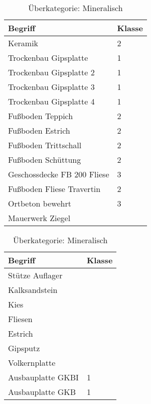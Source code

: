\begin{table}[h]
	\label{t:evaluation-example3}
	\centering
	\begin{tabular}{|p{}|p{}|}
		\hline
		\textbf{Begriff} & \textbf{Klasse} \\ \hline
	Keramik & 2 \\ \hline
	Trockenbau Gipsplatte & 1 \\ \hline
	Trockenbau Gipsplatte 2 & 1 \\ \hline
	Trockenbau Gipsplatte 3 & 1 \\ \hline
	Trockenbau Gipsplatte 4 & 1 \\ \hline
	Fußboden Teppich & 2 \\ \hline
	Fußboden Estrich & 2 \\ \hline
	Fußboden Trittschall & 2 \\ \hline
	Fußboden Schüttung & 2 \\ \hline
	Geschossdecke FB 200 Fliese & 3 \\ \hline
	Fußboden Fliese Travertin & 2 \\ \hline
	Ortbeton bewehrt & 3 \\ \hline
	Mauerwerk Ziegel & ~ \\ \hline
	\end{tabular}
	\caption{Überkategorie: Mineralisch}
\end{table}



\begin{table}[h]
	\label{t:evaluation-example4}
	\centering
	\begin{tabular}{|p{}|p{}|}
		\hline
		\textbf{Begriff} & \textbf{Klasse} \\ \hline
		Stütze Auflager & ~ \\ \hline
		Kalksandstein & ~ \\ \hline
		Kies & ~ \\ \hline
		Fliesen & ~ \\ \hline
		Estrich & ~ \\ \hline
		Gipsputz & ~ \\ \hline
		Volkernplatte & ~ \\ \hline
		Ausbauplatte GKBI & 1 \\ \hline
		Ausbauplatte GKB & 1 \\ \hline
	\end{tabular}
	\caption{Überkategorie: Mineralisch}
\end{table}

